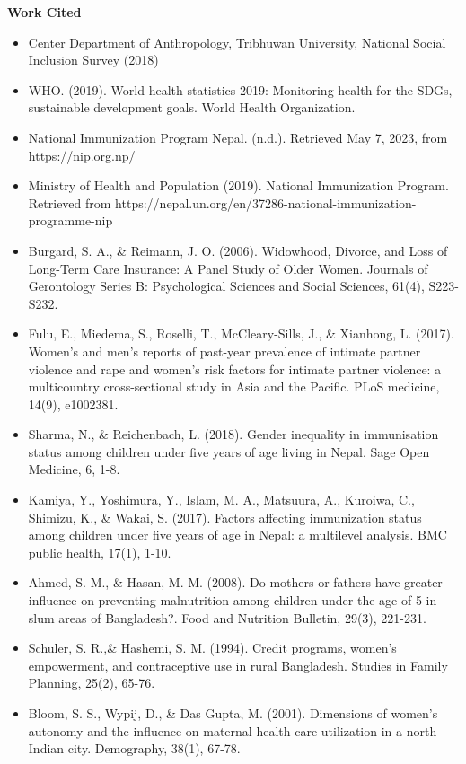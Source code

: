 \documentclass[12pt]{article}
\begin{document}

\begin{center}
\textbf{\fontsize{25pt}{1.5em}\selectfont
Work Cited}
\end{center}
\begin{itemize}
    \item Center Department of Anthropology, Tribhuwan University, National Social Inclusion Survey (2018)
    \item WHO. (2019). World health statistics 2019: Monitoring health for the SDGs, sustainable development goals. World Health Organization.
    \item National Immunization Program Nepal. (n.d.). Retrieved May 7, 2023, from https://nip.org.np/
    \item Ministry of Health and Population (2019). National Immunization Program. Retrieved from https://nepal.un.org/en/37286-national-immunization-programme-nip
    \item Burgard, S. A., \& Reimann, J. O. (2006). Widowhood, Divorce, and Loss of Long-Term Care Insurance: A Panel Study of Older Women. Journals of Gerontology Series B: Psychological Sciences and Social Sciences, 61(4), S223-S232.
    \item Fulu, E., Miedema, S., Roselli, T., McCleary-Sills, J., \& Xianhong, L. (2017). Women's and men's reports of past-year prevalence of intimate partner violence and rape and women's risk factors for intimate partner violence: a multicountry cross-sectional study in Asia and the Pacific. PLoS medicine, 14(9), e1002381.
    \item Sharma, N., \& Reichenbach, L. (2018). Gender inequality in immunisation status among children under five years of age living in Nepal. Sage Open Medicine, 6, 1-8.
    \item Kamiya, Y., Yoshimura, Y., Islam, M. A., Matsuura, A., Kuroiwa, C., Shimizu, K., \& Wakai, S. (2017). Factors affecting immunization status among children under five years of age in Nepal: a multilevel analysis. BMC public health, 17(1), 1-10.
    \item Ahmed, S. M., \& Hasan, M. M. (2008). Do mothers or fathers have greater influence on preventing malnutrition among children under the age of 5 in slum areas of Bangladesh?. Food and Nutrition Bulletin, 29(3), 221-231.
    \item Schuler, S. R.,\& Hashemi, S. M. (1994). Credit programs, women's empowerment, and contraceptive use in rural Bangladesh. Studies in Family Planning, 25(2), 65-76.
    \item Bloom, S. S., Wypij, D., \& Das Gupta, M. (2001). Dimensions of women's autonomy and the influence on maternal health care utilization in a north Indian city. Demography, 38(1), 67-78.

\end{itemize}
\end{document}
